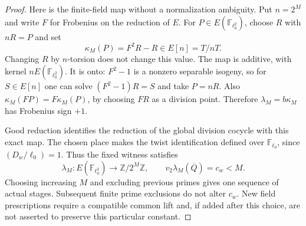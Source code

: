 \documentclass[11pt]{article}
\theoremstyle{definition}
\theoremstyle{remark}
\newcommand{\Z}{\mathbb Z}
\newcommand{\F}{\mathbb F}
\begin{document}
\begin{proof}
Here is the finite-field map without a normalization ambiguity.
Put $n=2^M$ and write $F$ for Frobenius on the reduction of $E$.
For $P\in E(\F_{\ell_0^2})$, choose $R$ with $nR=P$ and set
\[
                    \kappa_M(P)=F^2R-R\in E[n]=T/nT.
\]
Changing $R$ by $n$-torsion does not change this value.
The map is additive, with kernel $nE(\F_{\ell_0^2})$.
It is onto: $F^2-1$ is a nonzero separable isogeny, so for
$S\in E[n]$ one can solve $(F^2-1)R=S$ and take $P=nR$.
Also $\kappa_M(FP)=F\kappa_M(P)$, by choosing $FR$ as a
division point. Therefore $\lambda_M=b\kappa_M$ has
Frobenius sign $+1$.

Good reduction identifies the reduction of the global division
cocycle with this exact map. The chosen place makes the twist
identification defined over $\F_{\ell_0}$, since
$(D_w/\ell_0)=1$. Thus the fixed witness satisfies
\[
 \lambda_M:E(\F_{\ell_0^2})\longrightarrow\Z/2^M\Z,\qquad
 v_2\lambda_M(\overline Q)=c_w<M.                         \tag{O.2}
\]
Choosing increasing $M$ and excluding previous primes gives one
sequence of actual stages. Subsequent finite prime exclusions
do not alter $c_w$. New field prescriptions require a compatible
common lift and, if added after this choice, are not asserted to
preserve this particular constant.
\end{proof}

\end{document}
